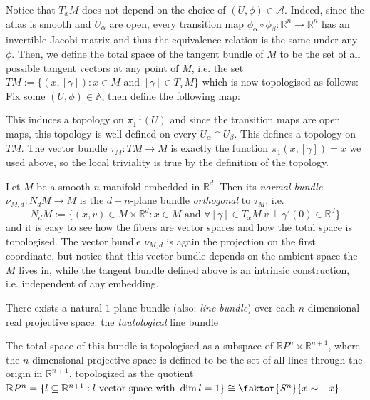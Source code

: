 \begin{examples}
\begin{i_enum}
Notice that $T_xM$ does not depend on the choice of $(U,\phi)\in\mathcal{A}$. Indeed, since the atlas is smooth and $U_{\alpha}$ are open, every transition map $\phi_{\alpha}\circ\phi_{\beta}:\mathbb{R}^n\to\mathbb{R}^n$ has an invertible Jacobi matrix and thus the equivalence relation is the same under any $\phi$. Then, we define the total space of the tangent bundle of $M$ to be the set of all possible tangent vectors at any point of $M$, i.e. the set
$TM:=\big\{(x,[\gamma]):x\in M\text{ and }[\gamma]\in T_xM\big\}$
which is now topologised as follows: Fix some $(U,\phi)\in\mathbb{A}$, then define the following map:
\begin{center}
\end{center}
This induces a topology on $\pi_1^{-1}(U)$ and since the transition maps are open maps, this topology is well defined on every $U_{\alpha}\cap U_{\beta}$. This defines a topology on $TM$. The vector bundle $\tau_{M}:TM\to M$ is exactly the function $\pi_1(x,[\gamma])=x$ we used above, so the local triviality is true by the definition of the topology.
\item Let $M$ be a smooth $n$-manifold embedded in $\mathbb{R}^d$. Then its \emph{normal bundle} $\nu_{M,d}:N_dM\to M$ is the $d-n$-plane bundle \emph{orthogonal} to $\tau_M$, i.e.
\[N_dM:=\big\{(x,v)\in M\times\mathbb{R}^d:x\in M\text{ and }\forall[\gamma]\in T_xM\ v\perp\gamma'(0)\in\mathbb{R}^d\big\}\]
and it is easy to see how the fibers are vector spaces and how the total space is topologised. The vector bundle $\nu_{M,d}$ is again the projection on the first coordinate, but notice that this vector bundle depends on the ambient space the $M$ lives in, while the tangent bundle defined above is an intrinsic construction, i.e. independent of any embedding.
\item\label{ex:tautological_line_bundle} There exists a natural $1$-plane bundle (also: \emph{line bundle}) over each $n$ dimensional real projective space: the \emph{tautological} line bundle
\begin{center}
\end{center}
The total space of this bundle is topologised as a subspace of $\mathbb{R}P^n\times\mathbb{R}^{n+1}$, where the $n$-dimensional projective space is defined to be the set of all lines through the origin in $\mathbb{R}^{n+1}$, topologized as the quotient
$\mathbb{R}P^n=\{l\subseteq\mathbb{R}^{n+1}:l\text{ vector space with }\dim l=1\}\cong\faktor{S^n}{x\sim-x}$.


\end{i_enum}
\end{examples}
